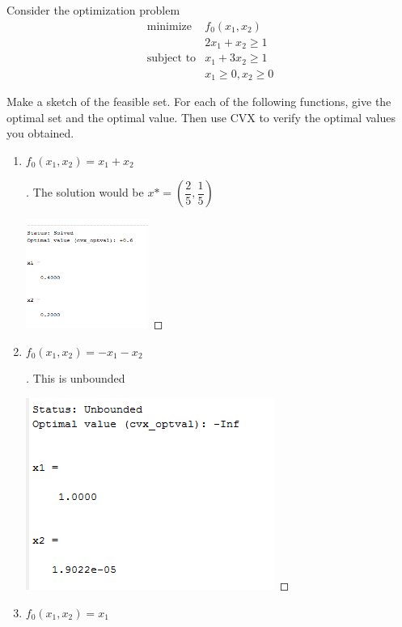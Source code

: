\begin{prob}[3.1]
  Consider the optimization problem
  \begin{eqnarray*}
    \mbox{minimize} & f_{0}(x_{1}, x_{2})\\
    & 2 x_{1} + x_{2} \geq 1\\
    \mbox{subject to} & x_{1} + 3x_{2} \geq 1\\
    & x_{1} \geq 0,x_{2} \geq 0
  \end{eqnarray*}

  Make a sketch of the feasible set. For each of the following functions, give
  the optimal set and the optimal value. Then use CVX to verify the optimal
  values you obtained.
\end{prob}
 \begin{enumerate}[label=(\alph*)]
  \item{$f_{0}(x_{1},x_{2}) = x_{1} + x_{2}$
    \begin{proof}[\sol]
      The solution would be $x* = \left ( \dfrac{2}{5},\dfrac{1}{5}\right )$
      
      \includegraphics[width=4cm]{source/h3q1a}
    \end{proof}    
  }
    \newpage
  \item{$f_{0}(x_{1},x_{2}) = -x_{1} - x_{2}$
    \begin{proof}[\sol]
      This is unbounded
      
      \includegraphics{source/h3q1b}
    \end{proof}
  }
    \newpage
   \item{$f_{0}(x_{1},x_{2}) = x_{1}$
}
\end{enumerate}
